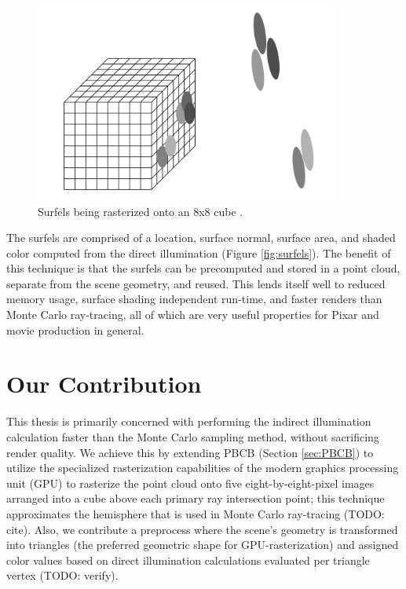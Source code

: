 \begin{figure}[p]
   \centering
   \includegraphics[width=100mm]{../img/surfel_raster.png}
   \captionfonts
   \caption{Surfels being rasterized onto an 8x8 cube \cite{bib:christensen_slides}.}
   \label{fig:surfel_raster}
\end{figure}

The surfels are comprised of a location, surface normal, surface area, and shaded color computed from the direct illumination (Figure \ref{fig:surfels}). The benefit of this technique is that the surfels can be precomputed and stored in a point cloud, separate from the scene geometry, and reused. This lends itself well to reduced memory usage, surface shading independent run-time, and faster renders than Monte Carlo ray-tracing, all of which are very useful properties for Pixar and movie production in general.

\section{Our Contribution}
This thesis is primarily concerned with performing the indirect illumination calculation faster than the Monte Carlo sampling method, without sacrificing render quality. We achieve this by extending PBCB (Section \ref{sec:PBCB}) to utilize the specialized rasterization capabilities of the modern graphics processing unit (GPU) to rasterize the point cloud onto five eight-by-eight-pixel images arranged into a cube above each primary ray intersection point; this technique approximates the hemisphere that is used in Monte Carlo ray-tracing (TODO: cite). Also, we contribute a preprocess where the scene's geometry is transformed into triangles (the preferred geometric shape for GPU-rasterization) and assigned color values based on direct illumination calculations evaluated per triangle vertex (TODO: verify).


